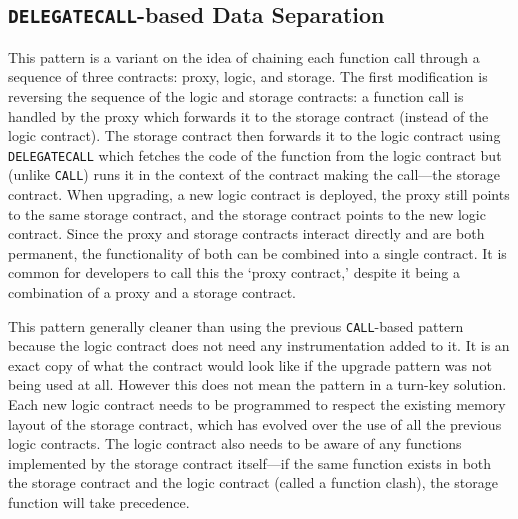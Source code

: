 
\subsection{\texttt{DELEGATECALL}-based Data Separation}
\label{sec:delegatecall}


This pattern is a variant on the idea of chaining each function call through a sequence of three contracts: proxy, logic, and storage. The first modification is reversing the sequence of the logic and storage contracts: a function call is handled by the proxy which forwards it to the storage contract (instead of the logic contract). The storage contract then forwards it to the logic contract using \texttt{DELEGATECALL} which fetches the code of the function from the logic contract but (unlike \texttt{CALL}) runs it in the context of the contract making the call---\ie the storage contract. When upgrading, a new logic contract is deployed, the proxy still points to the same storage contract, and the storage contract points to the new logic contract. Since the proxy and storage contracts interact directly and are both permanent, the functionality of both can be combined into a single contract. It is common for developers to call this the `proxy contract,' despite it being a combination of a proxy and a storage contract. 

This pattern generally cleaner than using the previous \texttt{CALL}-based pattern because the logic contract does not need any instrumentation added to it. It is an exact copy of what the contract would look like if the upgrade pattern was not being used at all. However this does not mean the pattern in a turn-key solution. Each new logic contract needs to be programmed to respect the existing memory layout of the storage contract, which has evolved over the use of all the previous logic contracts. The logic contract also needs to be aware of any functions implemented by the storage contract itself---if the same function exists in both the storage contract and the logic contract (called a function clash), the storage function will take precedence.

